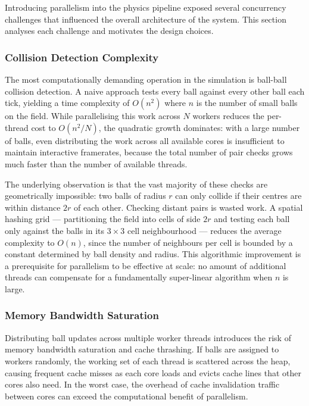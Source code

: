 \documentclass[12pt,a4paper]{article}
\begin{document}
Introducing parallelism into the physics pipeline exposed several concurrency
challenges that influenced the overall architecture of the system. This section
analyses each challenge and motivates the design choices.


\subsubsection{Collision Detection Complexity}

The most computationally demanding operation in the simulation is ball-ball
collision detection. A naive approach tests every ball against every other ball
each tick, yielding a time complexity of $O(n^2)$ where $n$ is the number of
small balls on the field. While parallelising this work across $N$ workers
reduces the per-thread cost to $O(n^2 / N)$, the quadratic growth dominates:
with a large number of balls, even distributing the work across all available
cores is insufficient to maintain interactive framerates, because the total
number of pair checks grows much faster than the number of available threads.

The underlying observation is that the vast majority of these checks are
geometrically impossible: two balls of radius $r$ can only collide if their
centres are within distance $2r$ of each other. Checking distant pairs is
wasted work. A spatial hashing grid — partitioning the field into cells of
side $2r$ and testing each ball only against the balls in its $3 \times 3$
cell neighbourhood — reduces the average complexity to $O(n)$, since the
number of neighbours per cell is bounded by a constant determined by ball
density and radius. This algorithmic improvement is a prerequisite for
parallelism to be effective at scale: no amount of additional threads can
compensate for a fundamentally super-linear algorithm when $n$ is large.


\subsubsection{Memory Bandwidth Saturation}

Distributing ball updates across multiple worker threads introduces the risk
of memory bandwidth saturation and cache thrashing. If balls are assigned to
workers randomly, the working set of each thread is scattered across the heap,
causing frequent cache misses as each core loads and evicts cache lines that
other cores also need. In the worst case, the overhead of cache invalidation
traffic between cores can exceed the computational benefit of parallelism.
\end{document}
